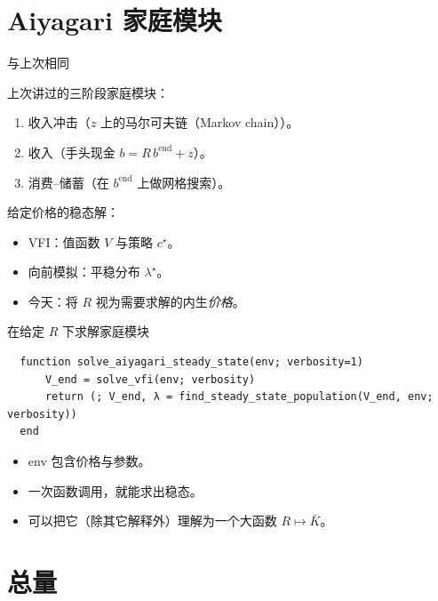 \documentclass[10pt,aspectratio=169]{beamer}
\begin{document}
\section{Aiyagari 家庭模块}

\begin{frame}{与上次相同}

  上次讲过的三阶段家庭模块：
  \begin{enumerate}
    \item 收入冲击（$z$ 上的马尔可夫链（Markov chain））。
    \item 收入（手头现金 $b = R\,b^{\mathrm{end}} + z$）。
    \item 消费--储蓄（在 $b^{\mathrm{end}}$ 上做网格搜索）。
  \end{enumerate}

  给定价格的稳态解：
  \begin{itemize}
    \item VFI：值函数 $V$ 与策略 $c^\star$。
    \item 向前模拟：平稳分布 $\lambda^\star$。
    \item 今天：将 $R$ 视为需要求解的内生\emph{价格}。
  \end{itemize}
\end{frame}

\begin{frame}[fragile]{在给定 $R$ 下求解家庭模块}
  \begin{lstlisting}
  function solve_aiyagari_steady_state(env; verbosity=1)
      V_end = solve_vfi(env; verbosity)
      return (; V_end, λ = find_steady_state_population(V_end, env; verbosity))
  end
  \end{lstlisting}

  \begin{itemize}
    \item env 包含价格与参数。
    \item 一次函数调用，就能求出稳态。
    \item 可以把它（除其它解释外）理解为一个大函数 $R \mapsto \bar K$。
  \end{itemize}
\end{frame}

\section{总量}
\end{document}
